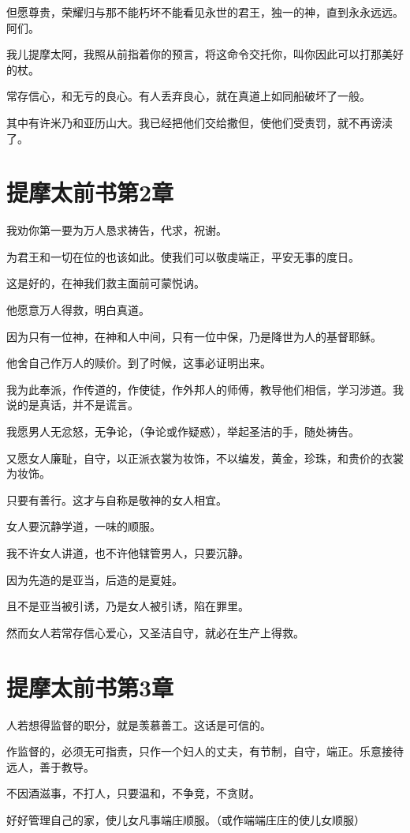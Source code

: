 \documentclass[12pt,oneside]{book}
\begin{document}
但愿尊贵，荣耀归与那不能朽坏不能看见永世的君王，独一的神，直到永永远远。阿们。

我儿提摩太阿，我照从前指着你的预言，将这命令交托你，叫你因此可以打那美好的杖。

常存信心，和无亏的良心。有人丢弃良心，就在真道上如同船破坏了一般。

其中有许米乃和亚历山大。我已经把他们交给撒但，使他们受责罚，就不再谤渎了。

\chapter{提摩太前书第2章}
我劝你第一要为万人恳求祷告，代求，祝谢。

为君王和一切在位的也该如此。使我们可以敬虔端正，平安无事的度日。

这是好的，在神我们救主面前可蒙悦讷。

他愿意万人得救，明白真道。

因为只有一位神，在神和人中间，只有一位中保，乃是降世为人的基督耶稣。

他舍自己作万人的赎价。到了时候，这事必证明出来。

我为此奉派，作传道的，作使徒，作外邦人的师傅，教导他们相信，学习涉道。我说的是真话，并不是谎言。

我愿男人无忿怒，无争论，（争论或作疑惑），举起圣洁的手，随处祷告。

又愿女人廉耻，自守，以正派衣裳为妆饰，不以编发，黄金，珍珠，和贵价的衣裳为妆饰。

只要有善行。这才与自称是敬神的女人相宜。

女人要沉静学道，一味的顺服。

我不许女人讲道，也不许他辖管男人，只要沉静。

因为先造的是亚当，后造的是夏娃。

且不是亚当被引诱，乃是女人被引诱，陷在罪里。

然而女人若常存信心爱心，又圣洁自守，就必在生产上得救。

\chapter{提摩太前书第3章}
人若想得监督的职分，就是羡慕善工。这话是可信的。

作监督的，必须无可指责，只作一个妇人的丈夫，有节制，自守，端正。乐意接待远人，善于教导。

不因酒滋事，不打人，只要温和，不争竞，不贪财。

好好管理自己的家，使儿女凡事端庄顺服。（或作端端庄庄的使儿女顺服）
\end{document}

